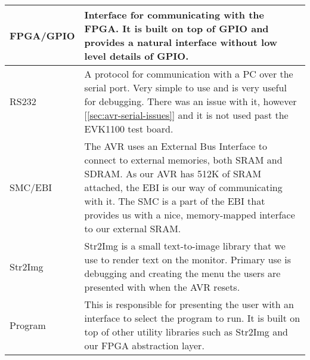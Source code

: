 \begin{table}[htbp]
\begin{tabular}{l|p{10cm}}
  \ac{FPGA}/\ac{GPIO} & Interface for communicating with the \ac{FPGA}. It is
  built on top of \ac{GPIO} and provides a natural interface without low level
  details of \ac{GPIO}. \\ \hline


  RS232 & A protocol for communication with a PC over the serial port. Very
  simple to use and is very useful for debugging. There was an issue with it,
  however [\ref{sec:avr-serial-issues}] and it is not used past the EVK1100 test
  board. \\ \hline
  
  SMC/EBI & The AVR uses an External Bus Interface to connect to external
  memories, both \ac{SRAM} and \ac{SDRAM}. As our AVR has 512K of \ac{SRAM}
  attached, the \ac{EBI} is our way of communicating with it. The \ac{SMC} is a
  part of the \ac{EBI} that provides us with a nice, memory-mapped interface to
  our external \ac{SRAM}. \\ \hline


  Str2Img & Str2Img is a small text-to-image library that we use to render text
  on the monitor. Primary use is debugging and creating the menu the users are
  presented with when the AVR resets. \\ \hline
  
  Program & This is responsible for presenting the user with an interface to
  select the program to run. It is built on top of other utility libraries such
  as Str2Img and our \ac{FPGA} abstraction layer. \\ \hline



\end{tabular}
\end{table}
